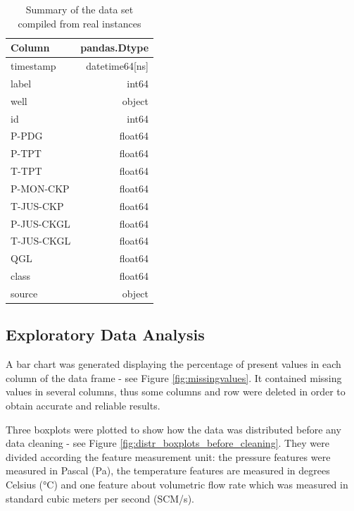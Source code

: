 \documentclass{article}
\begin{document}
\begin{table}
\centering
\begin{tabular}{l|r}

Column & pandas.Dtype \\\hline
timestamp & datetime64[ns] \\
label & int64 \\        
well & object \\       
id & int64 \\        
P-PDG & float64 \\      
P-TPT & float64  \\     
T-TPT & float64 \\      
P-MON-CKP & float64 \\      
T-JUS-CKP & float64 \\      
P-JUS-CKGL & float64\\       
T-JUS-CKGL & float64  \\     
QGL & float64 \\      
class & float64    \\   
source & object \\     

\end{tabular}
\caption{\label{tab:widgets}Summary of the data set compiled from real instances}
\end{table}

\subsection{Exploratory Data Analysis}

A bar chart was generated displaying the percentage of present values in each column of the data frame - see Figure \ref{fig:missingvalues}. It contained missing values in several columns, thus some columns and row were deleted in order to obtain accurate and reliable results.

Three boxplots were plotted to show how the data was distributed before any data cleaning - see Figure \ref{fig:distr_boxplots_before_cleaning}. They were divided according the feature measurement unit: the pressure features were measured in Pascal (Pa), the temperature features are measured in degrees Celsius (°C) and one feature about volumetric flow rate which was measured in standard cubic meters per second (SCM/s).
\end{document}
